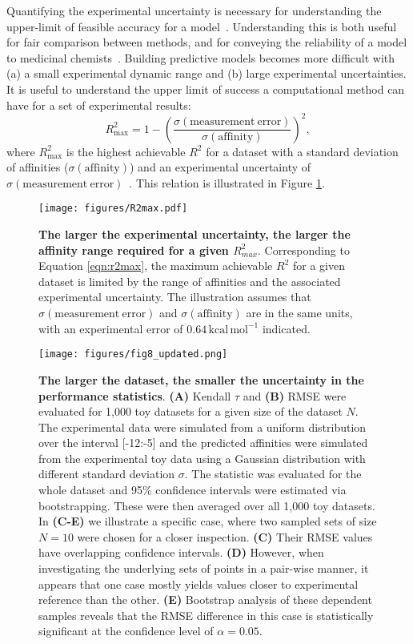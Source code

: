 \documentclass[9pt,bestpractices,pubversion]{livecoms}
\begin{document}
Quantifying the experimental uncertainty is necessary for understanding the upper-limit of feasible accuracy for a model~\cite{brown2009healthy}. Understanding this is both useful for fair comparison between methods, and for conveying the reliability of a model to medicinal chemists~\cite{griffen2020chemists}. Building predictive models becomes more difficult with (a) a small experimental dynamic range and (b) large experimental uncertainties. It is useful to understand the upper limit of success a computational method can have for a set of experimental results:
%
\begin{equation}\label{eqn:r2max}
    R^2_{\mathrm{max}} = 1 - \left(\frac{\sigma(\mathrm{measurement\   error})}{\sigma({\mathrm{affinity}})}\right) ^2,
\end{equation}
%
where $R^2_{\mathrm{max}}$ is the highest achievable $R^2$ for a dataset with a standard deviation of affinities ($\sigma(\mathrm{affinity})$) and an experimental uncertainty of  $\sigma\mathrm{(measurement\ error)}$~\cite{sheridan2020experimental}. This relation is illustrated in Figure \ref{fig:r2max}.

\begin{figure}[!ht]
    \texttt{[image: figures/R2max.pdf]}
    \caption{\textbf{The larger the experimental uncertainty, the larger the affinity range required for a given $R^2_{max}$}. Corresponding to Equation \ref{eqn:r2max}, the maximum achievable $R^2$ for a given dataset is limited by the range of affinities and the associated experimental uncertainty. The illustration assumes that $\sigma(\mathrm{measurement\ error})$ and $\sigma(\mathrm{affinity})$ are in the same units, with an experimental error of $0.64\,\mathrm{kcal\,mol^{-1}}$ indicated.}
    \label{fig:r2max}
\end{figure}

\begin{figure}[!ht]
    \centering
    \texttt{[image: figures/fig8\_updated.png]}
    \caption{\textbf{The larger the dataset, the smaller the uncertainty in the performance statistics}. \textbf{(A)} Kendall $\tau$ and \textbf{(B)} RMSE were evaluated for 1,000 toy datasets for a given size of the dataset $N$. The experimental data were simulated from a uniform distribution over the interval [-12:-5] and the predicted affinities were simulated from the experimental toy data using a Gaussian distribution with different standard deviation $\sigma$. The statistic was evaluated for the whole dataset and 95\% confidence intervals were estimated via bootstrapping. These were then averaged over all 1,000 toy datasets. In \textbf{(C-E)} we illustrate a specific case, where two sampled sets of size $N=10$ were chosen for a closer inspection. \textbf{(C)} Their RMSE values have overlapping confidence intervals. \textbf{(D)} However, when investigating the underlying sets of points in a pair-wise manner, it appears that one case mostly yields values closer to experimental reference than the other. \textbf{(E)} Bootstrap analysis of these dependent samples reveals that the RMSE difference in this case is statistically significant at the confidence level of $\alpha=0.05$.}
    \label{fig:N_CI}
\end{figure}
\end{document}
